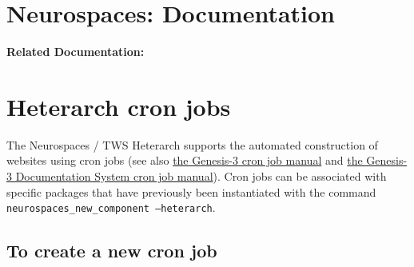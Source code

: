 \documentclass[12pt]{article}
\begin{document}
\section*{Neurospaces: Documentation}

{\bf Related Documentation:}

\section*{Heterarch cron jobs}

The Neurospaces / TWS Heterarch supports the automated construction of
websites using cron jobs (see also
\href{http://www.genesis-sim.org/userdocs/neurospaces-cron/neurospaces-cron.html}{the
  Genesis-3 cron job manual} and
\href{http://www.genesis-sim.org/userdocs/userdocs-cron/userdocs-cron.html}{the
  Genesis-3 Documentation System cron job manual}).  Cron jobs can be
associated with specific packages that have previously been
instantiated with the command {\tt neurospaces\_new\_component
  --heterarch}.


\subsection*{To create a new cron job}
\end{document}
